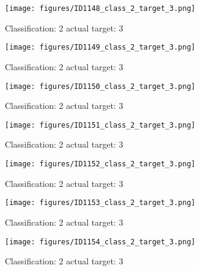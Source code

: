 \begin{figure}[h!]
\begin{center}
\texttt{[image: figures/ID1148\_class\_2\_target\_3.png]}
\end{center}
\caption{ Classification: 2 actual target: 3}
\label{fig:ID1148_class_2_target_3}
\end{figure}
\begin{figure}[h!]
\begin{center}
\texttt{[image: figures/ID1149\_class\_2\_target\_3.png]}
\end{center}
\caption{ Classification: 2 actual target: 3}
\label{fig:ID1149_class_2_target_3}
\end{figure}
\begin{figure}[h!]
\begin{center}
\texttt{[image: figures/ID1150\_class\_2\_target\_3.png]}
\end{center}
\caption{ Classification: 2 actual target: 3}
\label{fig:ID1150_class_2_target_3}
\end{figure}
\begin{figure}[h!]
\begin{center}
\texttt{[image: figures/ID1151\_class\_2\_target\_3.png]}
\end{center}
\caption{ Classification: 2 actual target: 3}
\label{fig:ID1151_class_2_target_3}
\end{figure}
\begin{figure}[h!]
\begin{center}
\texttt{[image: figures/ID1152\_class\_2\_target\_3.png]}
\end{center}
\caption{ Classification: 2 actual target: 3}
\label{fig:ID1152_class_2_target_3}
\end{figure}
\begin{figure}[h!]
\begin{center}
\texttt{[image: figures/ID1153\_class\_2\_target\_3.png]}
\end{center}
\caption{ Classification: 2 actual target: 3}
\label{fig:ID1153_class_2_target_3}
\end{figure}
\begin{figure}[h!]
\begin{center}
\texttt{[image: figures/ID1154\_class\_2\_target\_3.png]}
\end{center}
\caption{ Classification: 2 actual target: 3}
\label{fig:ID1154_class_2_target_3}
\end{figure}
